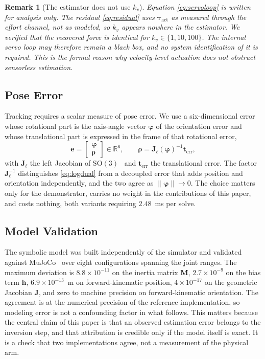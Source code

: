 \documentclass{ieeeaccess}
\newtheorem{remark}{Remark}
\newcommand{\R}{\mathbb{R}}
\newcommand{\Jfull}{\bm{J}}
\newcommand{\tauact}{\bm{\tau}_{\mathrm{act}}}
\begin{document}
\begin{remark}[The estimator does not use $k_v$]
Equation \eqref{eq:servoloop} is written for analysis only. The residual
\eqref{eq:residual} uses $\tauact$ as \emph{measured} through the effort channel,
not as modeled, so $k_v$ appears nowhere in the estimator. We verified that the
recovered force is identical for $k_v\in\{1,10,100\}$. The internal servo loop may
therefore remain a black box, and no system identification of it is required. This
is the formal reason why velocity-level actuation does not obstruct sensorless
estimation.
\label{rem:kv}
\end{remark}

\subsection{Pose Error}
\label{sec:poseerr}
Tracking requires a scalar measure of pose error. We use a six-dimensional error
whose rotational part is the axis-angle vector $\bm\varphi$ of the orientation
error and whose translational part is expressed in the frame of that rotational
error,
\begin{equation}
\bm e=\begin{bmatrix}\bm\varphi\\ \bm\rho\end{bmatrix}\in\R^{6},
\qquad
\bm\rho=\bm J_\ell(\bm\varphi)^{-1}\bm t_{\mathrm{err}},
\label{eq:logdual}
\end{equation}
with $\bm J_\ell$ the left Jacobian of $\mathrm{SO}(3)$~\cite{sola2018microlie}
and $\bm t_{\mathrm{err}}$ the translational error. The factor $\bm J_\ell^{-1}$
distinguishes \eqref{eq:logdual} from a decoupled error that adds position and
orientation independently, and the two agree as $\|\bm\varphi\|\to0$. The choice
matters only for the demonstrator, carries no weight in the contributions of this
paper, and costs nothing, both variants requiring $2.48$~ms per solve.

\subsection{Model Validation}
\label{sec:validation}
The symbolic model was built independently of the simulator and validated against
MuJoCo~\cite{todorov2012mujoco} over eight configurations spanning the joint
ranges. The maximum deviation is $8.8\times10^{-11}$ on the inertia matrix
$\bm M$, $2.7\times10^{-9}$ on the bias term $\bm h$, $6.9\times10^{-13}$~m on
forward-kinematic position, $4\times10^{-17}$ on the geometric Jacobian
$\Jfull$, and zero to machine precision on forward-kinematic orientation. The
agreement is at the numerical precision of the reference implementation, so
modeling error is not a confounding factor in what follows. This matters because
the central claim of this paper is that an observed estimation error belongs to
the inversion step, and that attribution is credible only if the model itself is
exact. It is a check that two implementations agree, not a measurement of the
physical arm.
\end{document}
